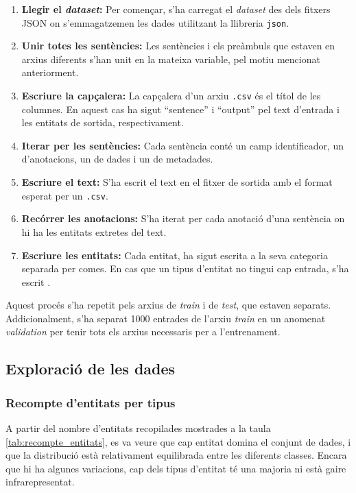 \begin{enumerate}
  \item \textbf{Llegir el \textit{dataset}:} Per començar, s'ha carregat el \textit{dataset} des dels fitxers JSON on s'emmagatzemen les dades utilitzant la llibreria \texttt{json}.
  \item \textbf{Unir totes les sentències:} Les sentències i els preàmbuls que estaven en arxius diferents s'han unit en la mateixa variable, pel motiu mencionat anteriorment.
  \item \textbf{Escriure la capçalera:} La capçalera d'un arxiu \texttt{.csv} és el títol de les columnes. En aquest cas ha sigut ``sentence'' i ``output'' pel text d'entrada i les entitats de sortida, respectivament.
  \item \textbf{Iterar per les sentències:} Cada sentència conté un camp identificador, un d'anotacions, un de dades i un de metadades.
  \item \textbf{Escriure el text:} S'ha escrit el text en el fitxer de sortida amb el format esperat per un \texttt{.csv}.
  \item \textbf{Recórrer les anotacions:} S'ha iterat per cada anotació d'una sentència on hi ha les entitats extretes del text.
  \item \textbf{Escriure les entitats:} Cada entitat, ha sigut escrita a la seva categoria separada per comes. En cas que un tipus d'entitat no tingui cap entrada, s'ha escrit .
\end{enumerate}

Aquest procés s'ha repetit pels arxius de \textit{train} i de \textit{test}, que estaven separats. Addicionalment, s'ha separat 1000 entrades de l'arxiu \textit{train} en un anomenat \textit{validation} per tenir tots els arxius necessaris per a l'entrenament.



\subsection{Exploració de les dades}

\subsubsection{Recompte d'entitats per tipus}
A partir del nombre d'entitats recopilades mostrades a la taula \ref{tab:recompte_entitats}, es va veure que cap entitat domina el conjunt de dades, i que la distribució està relativament equilibrada entre les diferents classes. Encara que hi ha algunes variacions, cap dels tipus d'entitat té una majoria ni està gaire infrarepresentat.

